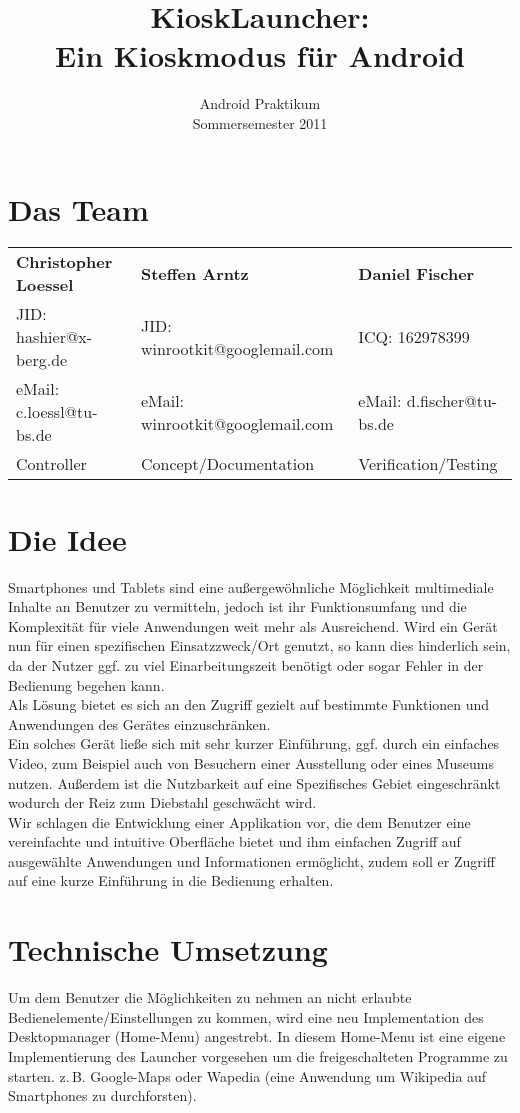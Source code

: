 \documentclass[12pt,a4paper,ngerman]{scrartcl}
\title{KioskLauncher: \\ Ein Kioskmodus für Android}
\subtitle{Android Praktikum \\ Sommersemester 2011}
\newcommand{\zB}{\mbox{z.\,B.}\xspace}
\begin{document}
\maketitle
\section*{Das Team}
\begin{tabular}{ l l l }
  \textbf{Christopher Loessel} & \textbf{Steffen Arntz} & \textbf{Daniel Fischer} \smallskip \\ 
  JID: hashier@x-berg.de & JID: winrootkit@googlemail.com & ICQ: 162978399 \\
  eMail: c.loessl@tu-bs.de & eMail: winrootkit@googlemail.com & eMail: d.fischer@tu-bs.de  \\
  Controller & Concept/Documentation & Verification/Testing \\
\end{tabular}

\section*{Die Idee}
Smartphones und Tablets sind eine außergewöhnliche Möglichkeit multimediale Inhalte an Benutzer zu vermitteln, jedoch ist ihr Funktionsumfang und die Komplexität für viele Anwendungen weit mehr als Ausreichend. 
Wird ein Gerät nun für einen spezifischen Einsatzzweck/Ort genutzt, so kann dies hinderlich sein, da der Nutzer ggf. zu viel Einarbeitungszeit benötigt oder sogar Fehler in der Bedienung begehen kann. \\
Als Lösung bietet es sich an den Zugriff gezielt auf bestimmte Funktionen und Anwendungen des Gerätes einzuschränken. \\
Ein solches Gerät ließe sich mit sehr kurzer Einführung, ggf. durch ein einfaches Video, zum Beispiel auch von Besuchern einer Ausstellung oder eines Museums nutzen. Außerdem ist die Nutzbarkeit auf eine Spezifisches Gebiet eingeschränkt wodurch der Reiz zum Diebstahl geschwächt wird. \\
Wir schlagen die Entwicklung einer Applikation vor, die dem Benutzer eine vereinfachte und intuitive Oberfläche bietet und ihm einfachen Zugriff auf ausgewählte Anwendungen und Informationen ermöglicht, zudem soll er Zugriff auf eine kurze Einführung in die Bedienung erhalten.

\section*{Technische Umsetzung}
Um dem Benutzer die Möglichkeiten zu nehmen an nicht erlaubte Bedienelemente/Einstellungen zu kommen, wird eine neu Implementation des Desktopmanager (Home-Menu) angestrebt. In diesem Home-Menu ist eine eigene Implementierung des Launcher vorgesehen um die freigeschalteten Programme zu starten. \zB Google-Maps oder Wapedia (eine Anwendung um Wikipedia auf Smartphones zu durchforsten).
\end{document}
